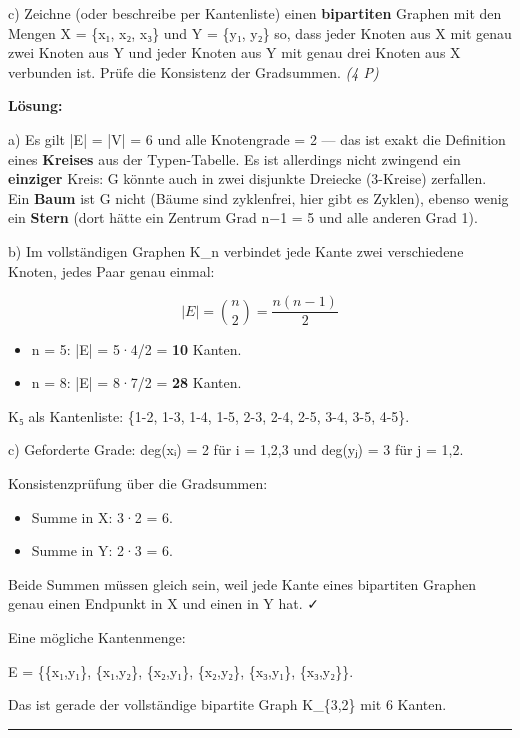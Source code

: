 \documentclass[11pt, a4paper]{article}
\begin{document}
c) Zeichne (oder beschreibe per Kantenliste) einen \textbf{bipartiten} Graphen mit den Mengen X = \{x₁, x₂, x₃\} und Y = \{y₁, y₂\} so, dass jeder Knoten aus X mit genau zwei Knoten aus Y und jeder Knoten aus Y mit genau drei Knoten aus X verbunden ist. Prüfe die Konsistenz der Gradsummen. \textit{(4 P)}


\textbf{Lösung:}


a) Es gilt |E| = |V| = 6 und alle Knotengrade = 2 — das ist exakt die Definition eines \textbf{Kreises} aus der Typen-Tabelle. Es ist allerdings nicht zwingend ein \textbf{einziger} Kreis: G könnte auch in zwei disjunkte Dreiecke (3-Kreise) zerfallen. Ein \textbf{Baum} ist G nicht (Bäume sind zyklenfrei, hier gibt es Zyklen), ebenso wenig ein \textbf{Stern} (dort hätte ein Zentrum Grad n−1 = 5 und alle anderen Grad 1).


b) Im vollständigen Graphen K\_n verbindet jede Kante zwei verschiedene Knoten, jedes Paar genau einmal:

\[
|E| = \binom{n}{2} = \frac{n(n-1)}{2}
\]


\begin{itemize}
  \item n = 5: |E| = 5·4/2 = \textbf{10} Kanten.
  \item n = 8: |E| = 8·7/2 = \textbf{28} Kanten.
\end{itemize}

K₅ als Kantenliste: \{1-2, 1-3, 1-4, 1-5, 2-3, 2-4, 2-5, 3-4, 3-5, 4-5\}.


c) Geforderte Grade: deg(xᵢ) = 2 für i = 1,2,3 und deg(yⱼ) = 3 für j = 1,2.


Konsistenzprüfung über die Gradsummen:

\begin{itemize}
  \item Summe in X: 3·2 = 6.
  \item Summe in Y: 2·3 = 6.
\end{itemize}

Beide Summen müssen gleich sein, weil jede Kante eines bipartiten Graphen genau einen Endpunkt in X und einen in Y hat. ✓


Eine mögliche Kantenmenge:

E = \{\{x₁,y₁\}, \{x₁,y₂\}, \{x₂,y₁\}, \{x₂,y₂\}, \{x₃,y₁\}, \{x₃,y₂\}\}.


Das ist gerade der vollständige bipartite Graph K\_\{3,2\} mit 6 Kanten.



\noindent\textcolor{rulegray}{\rule{\linewidth}{0.4pt}}
\end{document}
